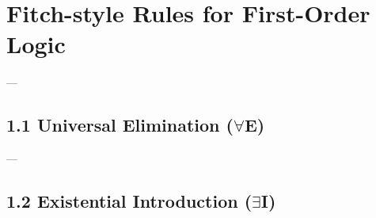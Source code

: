 \documentclass{article}
\begin{document}
\section*{Fitch-style Rules for First-Order Logic}

---

\subsection*{1.1 Universal Elimination ($\forall$E)}
\noindent
\begin{minipage}{0.48\textwidth}
\end{minipage}
\hfill
\begin{minipage}{0.48\textwidth}
\end{minipage}

---

\subsection*{1.2 Existential Introduction ($\exists$I)}
\noindent
\begin{minipage}{0.48\textwidth}
\end{minipage}
\hfill
\begin{minipage}{0.48\textwidth}
\end{minipage}
\end{document}
